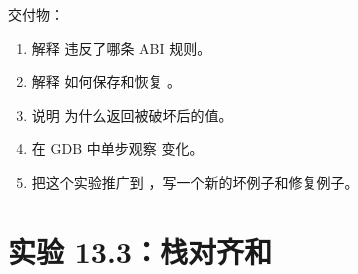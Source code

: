 \begin{labbox}
交付物：

\begin{enumerate}
  \item 解释  违反了哪条 ABI 规则。
  \item 解释  如何保存和恢复 。
  \item 说明  为什么返回被破坏后的值。
  \item 在 GDB 中单步观察  变化。
  \item 把这个实验推广到 ，写一个新的坏例子和修复例子。
\end{enumerate}
\end{labbox}

\section{实验 13.3：栈对齐和 }

